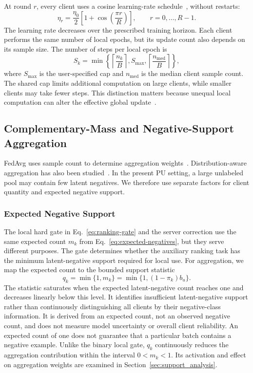 \documentclass[lettersize,journal]{IEEEtran}
\begin{document}
At round $r$, every client uses a cosine learning-rate schedule~\cite{ref_sgdr}, without restarts:
\begin{equation}
\eta_r=\frac{\eta_0}{2}\left[1+\cos\left(\frac{\pi r}{R}\right)\right],
\qquad r=0,\ldots,R-1.
\label{eq:cosine-lr}
\end{equation}
The learning rate decreases over the prescribed training horizon. Each client performs the same number of local epochs, but its update count also depends on its sample size. The number of steps per local epoch is
\begin{equation}
S_k=\min\left\{
\left\lceil\frac{n_k}{B}\right\rceil,
S_{\max},
\left\lceil\frac{n_{\mathrm{med}}}{B}\right\rceil
\right\},
\label{eq:local-budget}
\end{equation}
where $S_{\max}$ is the user-specified cap and $n_{\mathrm{med}}$ is the median client sample count. The shared cap limits additional computation on large clients, while smaller clients may take fewer steps. This distinction matters because unequal local computation can alter the effective global update~\cite{ref_fednova}.

\subsection{Complementary-Mass and Negative-Support Aggregation}

FedAvg uses sample count to determine aggregation weights~\cite{ref_fedavg}. Distribution-aware aggregation has also been studied~\cite{ref_feddisco}. In the present PU setting, a large unlabeled pool may contain few latent negatives. We therefore use separate factors for client quantity and expected negative support.

\subsubsection{Expected Negative Support}

The local hard gate in Eq.~\eqref{eq:ranking-gate} and the server correction use the same expected count $m_k$ from Eq.~\eqref{eq:expected-negatives}, but they serve different purposes. The gate determines whether the auxiliary ranking task has the minimum latent-negative support required for local use. For aggregation, we map the expected count to the bounded support statistic
\begin{equation}
q_k=\min\{1,m_k\}=\min\{1,(1-\pi_k)b_u\}.
\label{eq:negative-support}
\end{equation}
The statistic saturates when the expected latent-negative count reaches one and decreases linearly below this level. It identifies insufficient latent-negative support rather than continuously distinguishing all clients by their negative-class information. It is derived from an expected count, not an observed negative count, and does not measure model uncertainty or overall client reliability. An expected count of one does not guarantee that a particular batch contains a negative example. Unlike the binary local gate, $q_k$ continuously reduces the aggregation contribution within the interval $0<m_k<1$. Its activation and effect on aggregation weights are examined in Section~\ref{sec:support_analysis}.
\end{document}
